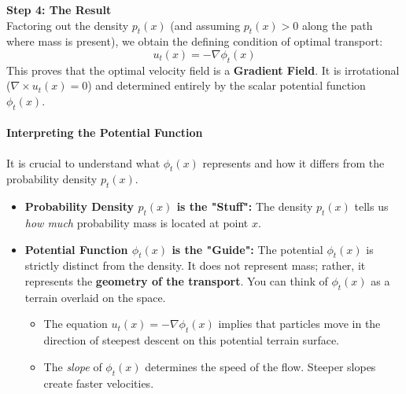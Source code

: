 \documentclass{book}
\begin{document}
\textbf{Step 4: The Result} \\
Factoring out the density $p_t(x)$ (and assuming $p_t(x) > 0$ along the path where mass is present), we obtain the defining condition of optimal transport:
\begin{equation}
u_t(x) = -\nabla \phi_t(x)
\end{equation}
This proves that the optimal velocity field is a \textbf{Gradient Field}. It is irrotational ($\nabla \times u_t(x) = 0$) and determined entirely by the scalar potential function $\phi_t(x)$.

\paragraph{Interpreting the Potential Function}
It is crucial to understand what $\phi_t(x)$ represents and how it differs from the probability density $p_t(x)$.

\begin{itemize}
    \item \textbf{Probability Density $p_t(x)$ is the "Stuff":}
    The density $p_t(x)$ tells us \textit{how much} probability mass is located at point $x$. 

    \item \textbf{Potential Function $\phi_t(x)$ is the "Guide":}
    The potential $\phi_t(x)$ is strictly distinct from the density. It does not represent mass; rather, it represents the \textbf{geometry of the transport}. You can think of $\phi_t(x)$ as a terrain overlaid on the space.
    \begin{itemize}
        \item The equation $u_t(x) = -\nabla \phi_t(x)$ implies that particles move in the direction of steepest descent on this potential terrain surface.
        \item The \textit{slope} of $\phi_t(x)$ determines the speed of the flow. Steeper slopes create faster velocities.
    \end{itemize}
\end{itemize}
\end{document}
